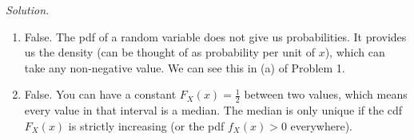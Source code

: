 \documentclass[11pt]{article}
\newenvironment{solution}{%
  \noindent\textit{Solution.}\quad
}{\par\bigskip}
\begin{document}
\begin{solution}
\begin{enumerate}
      \item False. The pdf of a random variable does not give us probabilities. It 
            provides us the density (can be thought of as probability per unit of $x$), 
            which can take any non-negative value. We can see this in (a) of Problem 1.
      \item False. You can have a constant $F_X(x)=\frac{1}{2}$ between two values, 
            which means every value in that interval is a median. The median is only 
            unique if the cdf $F_X(x)$ is strictly increasing (or the pdf $f_X(x)
            > 0$ everywhere).
\end{enumerate}
\end{solution}
\end{document}
